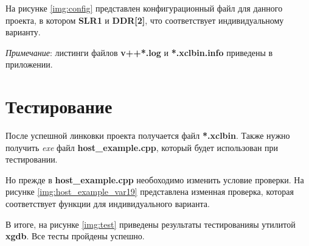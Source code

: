 На рисунке \ref{img:config} представлен конфигурационный файл для данного проекта, в котором \textbf{SLR1} и \textbf{DDR[2]}, что соответствует индивидуальному варианту.


\textit{Примечание}: листинги файлов \textbf{v++*.log} и \textbf{*.xclbin.info} приведены в приложении.


\section{Тестирование}

После успешной линковки проекта получается файл \textbf{*.xclbin}. Также нужно получить \textit{exe} файл \textbf{host\_example.cpp}, который будет использован при тестировании.

Но прежде в \textbf{host\_example.cpp} необоходимо изменить условие проверки. На рисунке \ref{img:host_example_var19} представлена изменная проверка, которая соответствует функции для индивидуального варианта.


В итоге, на рисунке \ref{img:test} приведены результаты тестированияы утилитой \textbf{xgdb}. Все тесты пройдены успешно.

